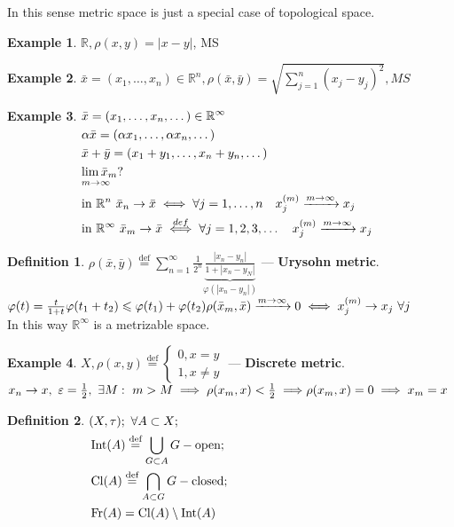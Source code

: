 \documentclass[12pt, fleqn]{article}
\makeatletter
\theoremstyle{definition}
\newtheorem*{defn}{Definition}
\newtheorem{ex}{Example}
\newcommand\alim[2]{
    \begin{array}[t]{@{}l@{}}
     \lim #1 \\[-1ex] \scriptstyle #2 
    \end{array}
}
\theoremstyle{break}
\theoremstyle{theorem}
\renewcommand\leq{\leqslant}
\renewcommand\phi{\varphi}
\renewcommand\epsilon{\varepsilon}
\newcommand{\defeq}{\overset{\text{def}}{=}}
\newcommand{\R}{\mathbb{R}}
\DeclareMathOperator{\clOp}{Cl}
\newcommand{\cl}[1]{\clOp({#1})}
\DeclareMathOperator{\intOp}{Int}
\newcommand{\inter}[1]{\intOp({#1})}
\DeclareMathOperator{\frOp}{Fr}
\newcommand{\fr}[1]{\frOp({#1})}
\makeatother
\begin{document}
\noindent
In this sense metric space is just a special case of topological space.
\begin{ex}
  $\R, \rho(x, y) = |x - y|$, MS
\end{ex}
\begin{ex}
  $\bar{x} = (x_1, \dotsc, x_n) \in \R^n, \rho(\bar{x}, \bar{y}) = \sqrt{\sum\limits_{j = 1}^n(x_j - y_j)^2}, MS$
\end{ex}
\begin{ex}
  $\begin{aligned}[t]
    & \bar{x} = (x_1, \dotsc, x_n, \dotso) \in \R^\infty \\ 
    & \alpha\bar{x} = (\alpha x_1, \dotsc, \alpha x_n, \dotso) \\ 
    & \bar{x} + \bar{y} = (x_1 + y_1, \dotsc, x_n + y_n, \dotso)\\
    & \alim{\bar{x}_m}{m \to \infty}?\\
    & \textnormal{in}\ \R^n\ \bar{x}_n \to \bar{x} \iff \forall j = 1,
    \dotsc, n\quad x_j^{(m)} \xrightarrow{m \to \infty} x_j \\ 
    & \textnormal{in}\ \R^{\infty}\ \bar{x}_m \to \bar{x} \overset{def}{\iff} \forall j = 1,2,3,\dotso \quad x_j^{(m)} \xrightarrow{m \to \infty} x_j
  \end{aligned}$
\end{ex}
\begin{defn}
  $\rho(\bar{x}, \bar{y}) \defeq \sum\limits_{n = 1}^\infty \frac{1}{2^n}\underbrace{\frac{|x_n - y_n|}{1 + |x_n - y_N|}}_{\phi(|x_n - y_n|)}$ 
  --- \textbf{Urysohn metric}. \\
  $\phi(t) = \frac{t}{1 + t} \\ 
  \phi(t_1 + t_2) \leq \phi(t_1) + \phi(t_2) \\ 
  \rho(\bar{x}_m, \bar{x}) \xrightarrow{m \to \infty} 0 \iff x_j^{(m)} \to x_j\ \forall j$\\
  In this way $\R^\infty$ is a metrizable space.
\end{defn}
\begin{ex}
$X, \rho(x, y) \defeq
\begin{cases}
  0, x = y
  \\1, x \neq y
\end{cases}$ --- \textbf{Discrete metric}. \\ 
$x_n \to x,\ \epsilon = \frac{1}{2},\ \exists M:\ m > M \implies \rho(x_m, x) < \frac{1}{2} \implies\\
\rho(x_m, x) = 0 \implies x_m = x$
\end{ex}
\begin{defn}
  $\begin{aligned}[t]
    & (X, \tau);\ \forall A \subset X; \\
    & \inter{A} \defeq \bigcup\limits_{G \subset A} G - \textnormal{open}; \\
    & \cl{A} \defeq \bigcap\limits_{A \subset G} G - \textnormal{closed}; \\
    & \fr{A} = \cl{A} \setminus \inter{A}
  \end{aligned}$
\end{defn}
\end{document}
